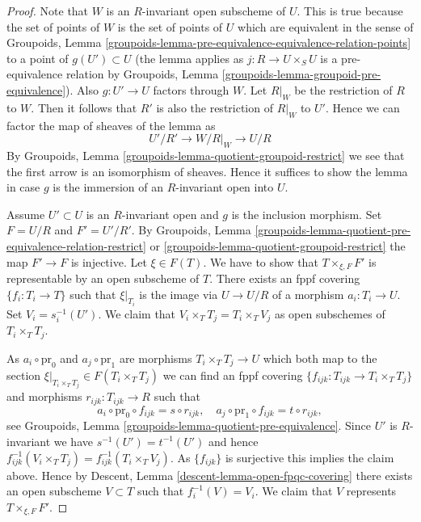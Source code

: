 \begin{proof}
Note that $W$ is an $R$-invariant open subscheme of $U$.
This is true because the set of points of $W$ is the set
of points of $U$ which are equivalent in the sense of
Groupoids,
Lemma \ref{groupoids-lemma-pre-equivalence-equivalence-relation-points}
to a point of $g(U') \subset U$ (the lemma applies as $j : R \to U \times_S U$
is a pre-equivalence relation by
Groupoids, Lemma \ref{groupoids-lemma-groupoid-pre-equivalence}).
Also $g : U' \to U$ factors through $W$.
Let $R|_W$ be the restriction of $R$ to $W$.
Then it follows that $R'$ is also the restriction of $R|_W$ to $U'$.
Hence we can factor the map of sheaves of the lemma as
$$
U'/R' \longrightarrow W/R|_W \longrightarrow U/R
$$
By Groupoids, Lemma \ref{groupoids-lemma-quotient-groupoid-restrict}
we see that the first arrow is an isomorphism of sheaves.
Hence it suffices to show the lemma in case $g$ is the immersion
of an $R$-invariant open into $U$.

\medskip\noindent
Assume $U' \subset U$ is an $R$-invariant open and $g$ is the inclusion
morphism. Set $F = U/R$ and $F' = U'/R'$. By
Groupoids,
Lemma \ref{groupoids-lemma-quotient-pre-equivalence-relation-restrict}
or \ref{groupoids-lemma-quotient-groupoid-restrict}
the map $F' \to F$ is injective. Let $\xi \in F(T)$.
We have to show that $T \times_{\xi, F} F'$ is representable
by an open subscheme of $T$.
There exists an fppf covering $\{f_i : T_i \to T\}$ such that
$\xi|_{T_i}$ is the image via $U \to U/R$ of a morphism $a_i : T_i \to U$.
Set $V_i = s_i^{-1}(U')$.
We claim that $V_i \times_T T_j = T_i \times_T V_j$ as open subschemes
of $T_i \times_T T_j$.

\medskip\noindent
As $a_i \circ \text{pr}_0$ and $a_j \circ \text{pr}_1$ are morphisms
$T_i \times_T T_j \to U$ which both map to the section
$\xi|_{T_i \times_T T_j} \in F(T_i \times_T T_j)$ we can find
an fppf covering $\{f_{ijk} : T_{ijk} \to T_i \times_T T_j\}$ and morphisms
$r_{ijk} : T_{ijk} \to R$ such that
$$
a_i \circ \text{pr}_0 \circ f_{ijk} = s \circ r_{ijk},
\quad
a_j \circ \text{pr}_1 \circ f_{ijk} = t \circ r_{ijk},
$$
see
Groupoids, Lemma \ref{groupoids-lemma-quotient-pre-equivalence}.
Since $U'$ is $R$-invariant we have $s^{-1}(U') = t^{-1}(U')$ and
hence $f_{ijk}^{-1}(V_i \times_T T_j) = f_{ijk}^{-1}(T_i \times_T V_j)$.
As $\{f_{ijk}\}$ is surjective this implies the claim above.
Hence by
Descent, Lemma \ref{descent-lemma-open-fpqc-covering}
there exists an open subscheme $V \subset T$ such that
$f_i^{-1}(V) = V_i$. We claim that $V$ represents $T \times_{\xi, F} F'$.


\end{proof}
